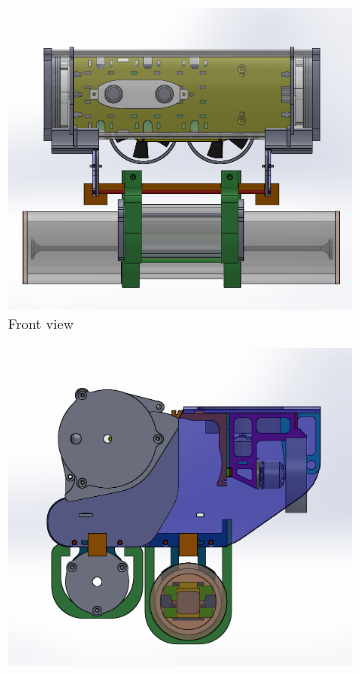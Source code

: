\documentclass {udthesis}
\begin{document}
\begin{figure}	
    \centering
    \begin{subfigure}[]{0.33\textwidth}
        \centering
        \includegraphics[width=0.95\linewidth]{cooprov_frontview}
        \caption{Front view}
        \label{fig:cooprov_frontview}
    \end{subfigure}%
    \begin{subfigure}[]{0.33\textwidth}
        \centering
        \includegraphics[width=0.95\linewidth]{cooprov_sideview}

\end{subfigure}
\end{figure}
\end{document}
